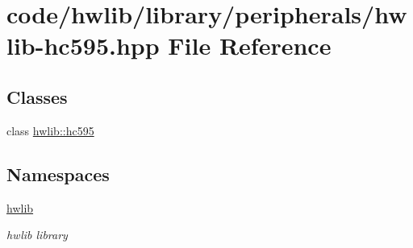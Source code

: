 \hypertarget{hwlib-hc595_8hpp}{}\section{code/hwlib/library/peripherals/hwlib-\/hc595.hpp File Reference}
\label{hwlib-hc595_8hpp}
\subsection*{Classes}
\begin{DoxyCompactItemize}
\item 
class \hyperlink{classhwlib_1_1hc595}{hwlib\+::hc595}
\end{DoxyCompactItemize}
\subsection*{Namespaces}
\begin{DoxyCompactItemize}
\item 
 \hyperlink{namespacehwlib}{hwlib}
\begin{DoxyCompactList}\small\item\em hwlib library \end{DoxyCompactList}\end{DoxyCompactItemize}
